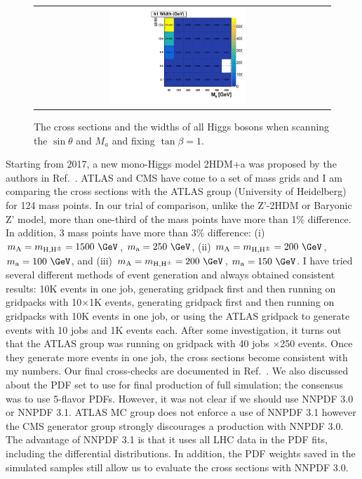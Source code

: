 \begin{figure}[htb]
\begin{tabular}{cc}
\includegraphics[width=0.49\textwidth]{2HDM/varysinp/MH750_MA500_MDM1/2HDMPZ2_h1width_varysinp.pdf}\\
 \end{tabular}
  \caption{The cross sections and the widths of all Higgs bosons when scanning the $\sin\theta$ and $M_a$ and fixing 
 $\tan\beta=1$.}
  \label{fig:scansinwidth}
\end{figure}



Starting from 2017, a new mono-Higgs model 2HDM+a was proposed by the authors in Ref.~\cite{2HDMa}. 
ATLAS and CMS have come to a set of mass grids and I am comparing the cross sections with 
the ATLAS group (University of Heidelberg) for 124 mass points. In our trial of comparison, unlike 
the Z'-2HDM or Baryonic Z' model, more than one-third of the mass points have more than 1\% difference.
In addition, 3 mass points have more than 3\% difference: (i) $m_\mathrm{A}=m_\mathrm{H,H^{\pm}}=1500~\GeV$, $m_\mathrm{a}=250~\GeV$, (ii) $m_\mathrm{A}=m_\mathrm{H,H^{\pm}}=200~\GeV$, $m_\mathrm{a}=100~\GeV$,
and (iii) $m_\mathrm{A}=m_\mathrm{H,H^{\pm}}=200~\GeV$, $m_\mathrm{a}=150~\GeV$. I have tried several 
different methods of event generation and always obtained consistent results: 10K events in one job, 
generating gridpack first and then running on gridpacks with 10$\times$1K events,  
generating gridpack first and then running on gridpacks with 10K events in one job, or 
using the ATLAS gridpack to generate events with 10 jobs and 1K events each. After some 
investigation, it turns out that the ATLAS group was running on gridpack with 40 jobs $\times$250 
events. Once they generate more events in one job, the cross sections become consistent with my 
numbers. Our final cross-checks are documented in Ref.~\cite{Eiko2HDMa}. We also discussed about the PDF set 
to use for final production of full simulation; the consensus was to use 5-flavor PDFs. However, it was not 
clear if we should use NNPDF 3.0 or NNPDF 3.1. ATLAS MC group does not enforce a use of NNPDF 3.1 however the CMS 
generator group strongly discourages a production with NNPDF 3.0. The advantage of NNPDF 3.1 is that it 
uses all LHC data in the PDF fits, including the differential \cPqt\cPaqt \pt distributions. In addition, the 
PDF weights saved in the simulated samples still allow us to evaluate the cross sections with NNPDF 3.0. 

